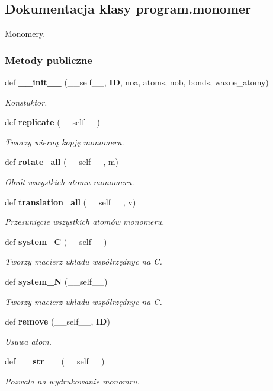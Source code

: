 \subsection{Dokumentacja klasy program.\+monomer}
\label{classprogram_1_1monomer}


Monomery.  


\subsubsection*{Metody publiczne}
\begin{DoxyCompactItemize}
\item 
def \textbf{ \+\_\+\+\_\+init\+\_\+\+\_\+} (\+\_\+\+\_\+self\+\_\+\+\_\+, \textbf{ ID}, noa, atoms, nob, bonds, wazne\+\_\+atomy)
\begin{DoxyCompactList}\small\item\em Konstuktor. \end{DoxyCompactList}\item 
def \textbf{ replicate} (\+\_\+\+\_\+self\+\_\+\+\_\+)
\begin{DoxyCompactList}\small\item\em Tworzy wierną kopję monomeru. \end{DoxyCompactList}\item 
def \textbf{ rotate\+\_\+all} (\+\_\+\+\_\+self\+\_\+\+\_\+, m)
\begin{DoxyCompactList}\small\item\em Obrót wszystkich atomu monomeru. \end{DoxyCompactList}\item 
def \textbf{ translation\+\_\+all} (\+\_\+\+\_\+self\+\_\+\+\_\+, v)
\begin{DoxyCompactList}\small\item\em Przesunięcie wszystkich atomów monomeru. \end{DoxyCompactList}\item 
def \textbf{ system\+\_\+C} (\+\_\+\+\_\+self\+\_\+\+\_\+)
\begin{DoxyCompactList}\small\item\em Tworzy macierz układu współrzędnyc na C. \end{DoxyCompactList}\item 
def \textbf{ system\+\_\+N} (\+\_\+\+\_\+self\+\_\+\+\_\+)
\begin{DoxyCompactList}\small\item\em Tworzy macierz układu współrzędnyc na C. \end{DoxyCompactList}\item 
def \textbf{ remove} (\+\_\+\+\_\+self\+\_\+\+\_\+, \textbf{ ID})
\begin{DoxyCompactList}\small\item\em Usuwa atom. \end{DoxyCompactList}\item 
def \textbf{ \+\_\+\+\_\+str\+\_\+\+\_\+} (\+\_\+\+\_\+self\+\_\+\+\_\+)
\begin{DoxyCompactList}\small\item\em Pozwala na wydrukowanie monomru. \end{DoxyCompactList}\end{DoxyCompactItemize}

